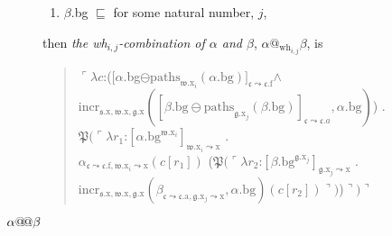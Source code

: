\begin{description}
\begin{enumerate}
  \item $\beta$.bg $\sqsubseteq$  for some natural number,
    $j$,
  \end{enumerate}
  then \textit{the \textit{wh}$_{i,j}$-combination of $\alpha$ and
    $\beta$}, $\alpha\text{@}_{\mathrm{wh}_{i,j}}\beta$, is
  \begin{quote}
    $\ulcorner\lambda
    c$:([$\alpha$.bg$\ominus\mathrm{paths}_{\mathfrak{w}.\text{x}_i}(\alpha.\text{bg})]_{\mathfrak{c}\leadsto\mathfrak{c}.\text{f}}$\d{$\wedge$}\\
    \hspace*{5em}$\mathrm{incr}_{\mathfrak{s}.\text{x},\mathfrak{w}.\text{x},\mathfrak{g}.\text{x}}([\beta.\text{bg}\ominus\mathrm{paths}_{\mathfrak{g}.\text{x}_j}(\beta.\text{bg})]_{\mathfrak{c}\leadsto\mathfrak{c}.a},\alpha.\text{bg})$)
    . \\
    \hspace*{1em} $\mathfrak{P}(\ulcorner\lambda r_1$:$[\alpha.\text{bg}^{\mathfrak{w}.\text{x}_i}]_{\mathfrak{w}.\text{x}_i\leadsto\text{x}}$ . \\
    \hspace*{4em}$\alpha_{\mathfrak{c}\leadsto\mathfrak{c}.\text{f},\mathfrak{w}.\text{x}_i\leadsto\text{x}}(c[r_1])$
    ($\mathfrak{P}(\ulcorner\lambda r_2$:$[\beta.\text{bg}^{\mathfrak{g}.\text{x}_j}]_{\mathfrak{g}.\text{x}_j\leadsto\text{x}}$ . \\
    \hspace*{15em}$\mathrm{incr}_{\mathfrak{s}.\text{x},\mathfrak{w}.\text{x},\mathfrak{g}.\text{x}}(\beta_{\mathfrak{c}\leadsto\mathfrak{c}.\text{a},\mathfrak{g}.\text{x}_j\leadsto\text{x}},\alpha.\text{bg})(c[r_2])\urcorner)$)$\urcorner)\urcorner$
  \end{quote} 

  \item[\textnormal{$\alpha\text{@\!@}\beta$}] \mbox{}


\end{description}
